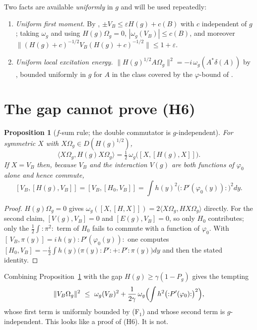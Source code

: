 \documentclass[11pt,a4paper]{article}
\theoremstyle{plain}
\newtheorem{proposition}[theorem]{Proposition}
\theoremstyle{definition}
\newcommand{\Om}{\Omega}
\newcommand{\ip}[2]{\langle #1,#2\rangle}
\begin{document}
Two facts are available \emph{uniformly} in $g$ and will be used repeatedly:
\begin{enumerate}
\item[\textbf{(F$_1$)}] \emph{Uniform first moment.} By \cite[Thm.~2]{GRS72}, $\pm V_B\le\varepsilon
      H(g)+c(B)$ with $c$ independent of $g$; taking $\omega_g$ and using $H(g)\Om_g=0$,
      $|\omega_g(V_B)|\le c(B)$, and moreover
      $\|(H(g)+c)^{-1/2}V_B(H(g)+c)^{-1/2}\|\le1+\varepsilon$.
\item[\textbf{(F$_2$)}] \emph{Uniform local excitation energy.} $\|H(g)^{1/2}A\Om_g\|^2
      =-i\,\omega_g(A^*\delta(A))$ by \cite[Lem.~2.1]{M0}, bounded uniformly in $g$ for $A$ in the
      class covered by the $\varphi$-bound of \cite{GJIV}.
\end{enumerate}

\section{The gap cannot prove (H6)}\label{sec:neg}

\begin{proposition}[$f$-sum rule; the double commutator is $g$-independent]\label{prop:fsum}
For symmetric $X$ with $X\Om_g\in D(H(g)^{1/2})$,
\[
  \ip{X\Om_g}{H(g)X\Om_g}=\tfrac12\,\omega_g\bigl([X,[H(g),X]]\bigr).
\]
If $X=V_B$ then, because $V_B$ and the interaction $V(g)$ are both functions of $\varphi_0$ alone
and hence commute,
\[
  [V_B,[H(g),V_B]]=[V_B,[H_0,V_B]]=\int h(y)^2\bigl({:}P'(\varphi_0(y)){:}\bigr)^2dy .
\]
\end{proposition}

\begin{proof}
$H(g)\Om_g=0$ gives $\omega_g([X,[H,X]])=2\ip{X\Om_g}{HX\Om_g}$ directly. For the second claim,
$[V(g),V_B]=0$ and $[E(g),V_B]=0$, so only $H_0$ contributes; only the $\tfrac12\int{:}\pi^2{:}$
term of $H_0$ fails to commute with a function of $\varphi_0$. With
$[\,V_B,\pi(y)]=i\,h(y){:}P'(\varphi_0(y)){:}$ one computes
$[H_0,V_B]=-\tfrac i2\int h(y)\bigl(\pi(y){:}P'{:}+{:}P'{:}\pi(y)\bigr)dy$ and then the stated
identity.
\end{proof}

Combining Proposition~\ref{prop:fsum} with the gap $H(g)\ge\gamma(1-P_g)$ gives the tempting
\begin{equation}\label{eq:tempting}
  \|V_B\Om_g\|^2\ \le\ \omega_g(V_B)^2+\frac{1}{2\gamma}\,
  \omega_g\Bigl(\int h^2\bigl({:}P'(\varphi_0){:}\bigr)^2\Bigr),
\end{equation}
whose first term is uniformly bounded by (F$_1$) and whose second term is $g$-independent. This
looks like a proof of (H6). It is not.
\end{document}

